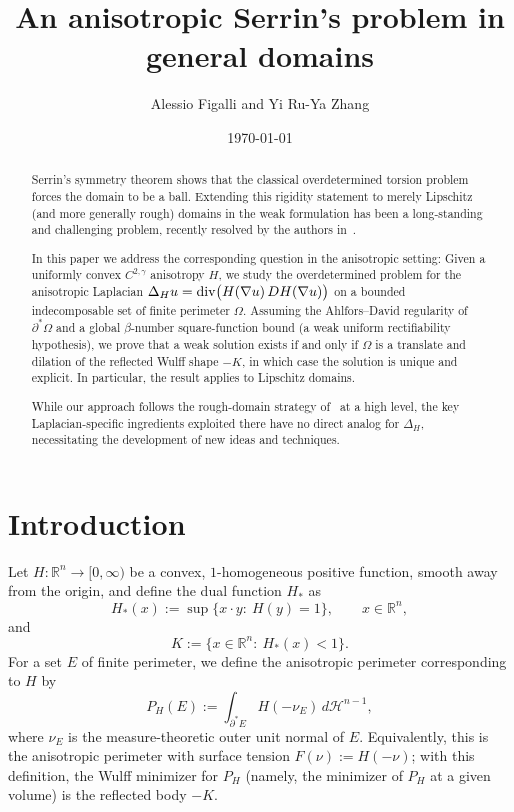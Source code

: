 \documentclass[reqno,11pt]{amsart}
\title[An anisotropic Serrin's problem in general domains]{An anisotropic Serrin's problem in general domains}
\author{Alessio Figalli and Yi Ru-Ya Zhang}
\date{\today}
\numberwithin{equation}{section}
\theoremstyle{remark}
\begin{document}
\begin{abstract}
Serrin's symmetry theorem shows that the classical overdetermined torsion problem forces the
domain to be a ball. Extending this rigidity statement to merely Lipschitz (and more generally
rough) domains in the weak formulation has been a long-standing and challenging problem,
recently resolved by the authors in~\cite{FZ2025}.

In this paper we address the corresponding question in the
anisotropic setting: Given a uniformly convex $C^{2,\gamma}$ anisotropy $H$, we study the
overdetermined problem for the anisotropic Laplacian
$\Delta_H u={\rm div}\big(H(\nabla u)\,DH(\nabla u)\big)$ on a bounded indecomposable set
of finite perimeter $\Omega$. Assuming the Ahlfors--David regularity of $\partial^*\Omega$ and
a global $\beta$-number square-function bound (a weak uniform rectifiability hypothesis),
we prove that a weak solution exists if and only if $\Omega$ is a translate and dilation of
{the reflected Wulff shape $-K$}, in which case the solution is unique and explicit. In particular, the result
applies to Lipschitz domains. 

While our approach follows the rough-domain strategy of~\cite{FZ2025} at a high level, 
the key Laplacian-specific ingredients exploited there have no direct analog for $\Delta_H$, 
necessitating the development of new ideas and techniques.

\end{abstract}
 
\maketitle

\section{Introduction}
Let $H:\mathbb R^n\to[0,\infty)$ be a convex, $1$-homogeneous positive function, smooth away from the origin, and define the dual function $H_*$ as
\[
H_*(x):=\sup\{x\cdot y:\ H(y)=1\},\qquad x\in\mathbb R^n,
\]
and
\[
K:=\{x\in\mathbb R^n:\ H_*(x)<1\}.
\]
For a set $E$ of finite perimeter, we define the anisotropic perimeter corresponding to $H$ by
\[
P_H(E):=\int_{\partial^*E} H(-\nu_E)\,d\mathscr H^{n-1},
\]
where $\nu_E$ is the measure-theoretic outer unit normal of $E$.
Equivalently, this is the anisotropic perimeter with surface tension $F(\nu):=H(-\nu)$; with this definition,
the Wulff minimizer for $P_H$ (namely, the minimizer of $P_H$ at a given volume) is the reflected body $-K$.
\end{document}
